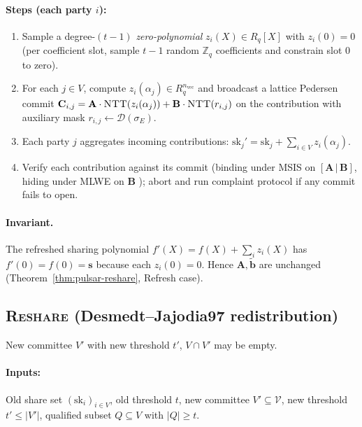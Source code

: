 \paragraph{Steps (each party $i$):}
\begin{enumerate}[leftmargin=2em, nosep]
\item Sample a degree-$(t-1)$ \emph{zero-polynomial}
      $z_i(X) \in R_q[X]$ with $z_i(0) = 0$ (per coefficient slot,
      sample $t-1$ random $\mathbb{Z}_q$ coefficients and constrain
      slot 0 to zero).
\item For each $j \in V$, compute $z_i(\alpha_j) \in R_q^{n_{\mathrm{vec}}}$
      and broadcast a lattice Pedersen commit
      $\mathbf{C}_{i,j} = \mathbf{A} \cdot \textsc{NTT}(z_i(\alpha_j))
      + \mathbf{B} \cdot \textsc{NTT}(r_{i,j})$ on the contribution
      with auxiliary mask $r_{i,j} \leftarrow \mathcal{D}(\sigma_E)$.
\item Each party $j$ aggregates incoming contributions:
      $\mathrm{sk}_j' = \mathrm{sk}_j + \sum_{i \in V} z_i(\alpha_j)$.
\item Verify each contribution against its commit (binding under
      MSIS on $[\mathbf{A}\,|\,\mathbf{B}]$, hiding under MLWE on
      $\mathbf{B}$ \cite{wongwangwing02}); abort and run complaint
      protocol if any commit fails to open.
\end{enumerate}

\paragraph{Invariant.} The refreshed sharing polynomial
$f'(X) = f(X) + \sum_i z_i(X)$ has $f'(0) = f(0) = \mathbf{s}$ because
each $z_i(0) = 0$. Hence $\mathbf{A}, \tilde{\mathbf{b}}$ are unchanged
(Theorem~\ref{thm:pulsar-reshare}, Refresh case).

\subsection{\textsc{Reshare} (Desmedt--Jajodia97 redistribution)}
\label{sec:protocol:reshare}

New committee $V'$ with new threshold $t'$, $V \cap V'$ may be empty.

\paragraph{Inputs:} Old share set $(\mathrm{sk}_i)_{i \in V}$, old
threshold $t$, new committee $V' \subseteq \mathcal{V}$, new
threshold $t' \leq |V'|$, qualified subset $Q \subseteq V$ with
$|Q| \geq t$.

